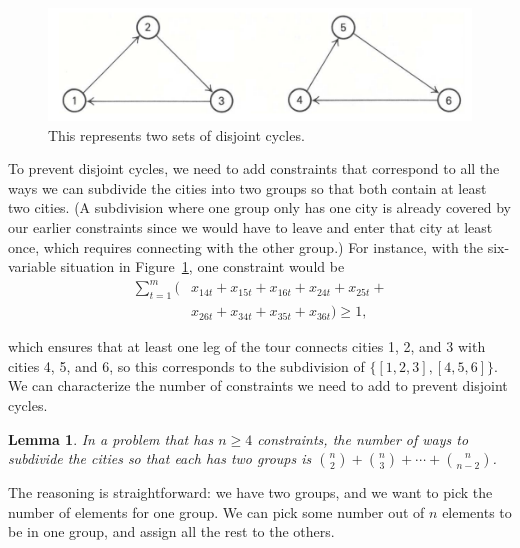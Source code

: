 \documentclass{article}
\newtheorem{lem}[thm]{Lemma}
\begin{document}
\begin{figure}[t]
\vskip 0.2in
\begin{center}
\centerline{\includegraphics[width=\columnwidth]{bad_solution}}
\caption{This represents two sets of disjoint cycles.}
\label{fig:bad_solution}
\end{center}
\vskip -0.2in
\end{figure}

To prevent disjoint cycles, we need to add constraints that correspond to all the ways we can subdivide the cities into two groups so that both
contain at least two cities. (A subdivision where one group only has one city is already covered by our earlier constraints since we would have to
leave and enter that city at least once, which requires connecting with the other group.) For instance, with the six-variable situation in
Figure~\ref{fig:bad_solution}, one constraint would be
\begin{align}
\sum_{t=1}^{m} (&x_{14t} + x_{15t} + x_{16t} + x_{24t} + x_{25t} + \\
& x_{26t} + x_{34t} + x_{35t} + x_{36t}) \ge 1, \nonumber
\end{align}

which ensures that at least one leg of the tour connects cities 1, 2, and 3 with cities 4, 5, and 6, so this corresponds to the subdivision of
$\{[1,2,3],[4,5,6]\}$. We can characterize the number of constraints we need to add to prevent disjoint cycles.

\begin{lem}\label{lem:cycle_constraints}
In a problem that has $n \ge 4$ constraints, the number of ways to subdivide the cities so that each has two groups is ${n \choose 2} + {n \choose 3}
+ \cdots + {n \choose n-2}$.
\end{lem}

The reasoning is straightforward: we have two groups, and we want to pick the number of elements for one group. We can pick some number out of $n$
elements to be in one group, and assign all the rest to the others.
\end{document}
